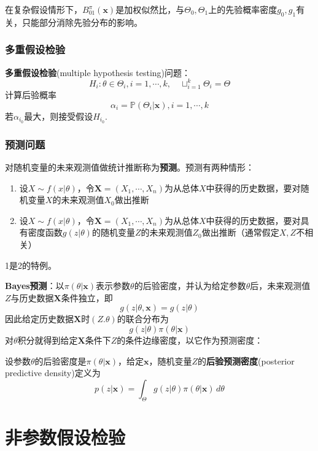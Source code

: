 \documentclass{ctexbook}
\begin{document}
在复杂假设情形下，$B_{01}^\pi(\mathbf{x})$是加权似然比，与$\Theta_0,\Theta_1$上的先验概率密度$g_0,g_1$有关，只能部分消除先验分布的影响。

\subsection{多重假设检验}

\begin{definition}[多重假设检验]
    \textbf{多重假设检验}(multiple hypothesis testing)问题：
    $$H_i:\theta\in\Theta_i,i=1,\cdots,k,\quad\sqcup_{i=1}^k\Theta_i=\Theta$$
    计算后验概率
    $$\alpha_i=\mathbb{P}(\Theta_i|\mathbf{x}),i=1,\cdots,k$$
    若$\alpha_{i_0}$最大，则接受假设$H_{i_0}$.
\end{definition}

\subsection{预测问题}

对随机变量的未来观测值做统计推断称为\textbf{预测}。预测有两种情形：\begin{enumerate}
    \item 设$X\sim f(x|\theta)$，令$\mathbf{X}=(X_1,\cdots,X_n)$为从总体$X$中获得的历史数据，要对随机变量$X$的未来观测值$X_0$做出推断
    \item 设$X\sim f(x|\theta)$，令$\mathbf{X}=(X_1,\cdots,X_n)$为从总体$X$中获得的历史数据，要对具有密度函数$g(z|\theta)$的随机变量$Z$的未来观测值$Z_0$做出推断（通常假定$X,Z$不相关）
\end{enumerate}

1是2的特例。

\textbf{Bayes预测}：以$\pi(\theta|\mathbf{x})$表示参数$\theta$的后验密度，并认为给定参数$\theta$后，未来观测值$Z$与历史数据$\mathbf{X}$条件独立，即
$$g(z|\theta,\mathbf{x})=g(z|\theta)$$
因此给定历史数据$\mathbf{X}$时$(Z.\theta)$的联合分布为
$$g(z|\theta)\pi(\theta|\mathbf{x})$$
对$\theta$积分就得到给定$\mathbf{X}$条件下$Z$的条件边缘密度，以它作为预测密度：
\begin{definition}[后验预测密度]
    设参数$\theta$的后验密度是$\pi(\theta|\mathbf{x})$，给定$\mathbf{x}$，随机变量$Z$的\textbf{后验预测密度}(posterior predictive density)定义为
    $$p(z|\mathbf{x})=\int_{\Theta}g(z|\theta)\pi(\theta|\mathbf{x})\,d\theta$$
\end{definition}

\chapter{非参数假设检验}
\end{document}
